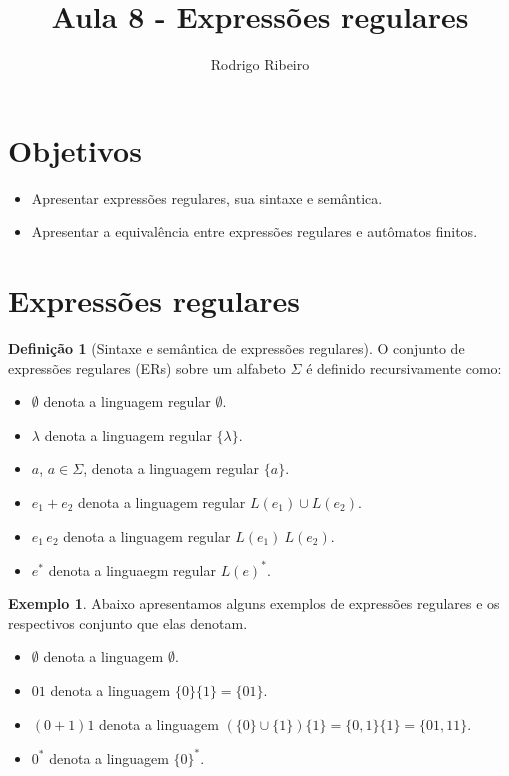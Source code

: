 \documentclass[a4paper]{article}
\theoremstyle{definition}
\newtheorem{Example}{Exemplo}
\newtheorem{Definition}{Definição}
\begin{document}
  \title{Aula 8 - Expressões regulares}
  \author{Rodrigo Ribeiro}

  \maketitle


  \pagestyle{fancy}


  \section*{Objetivos}

  \begin{itemize}
     \item Apresentar expressões regulares, sua sintaxe e semântica.
     \item Apresentar a equivalência entre expressões regulares e
           autômatos finitos.
  \end{itemize}

  \section{Expressões regulares}

  \begin{Definition}[Sintaxe e semântica de expressões regulares]
    O conjunto de expressões regulares (ERs) sobre um alfabeto $\Sigma$ é
    definido recursivamente como:
    \begin{itemize}
       \item $\emptyset$ denota a linguagem regular $\emptyset$.
       \item $\lambda$ denota a linguagem regular $\{\lambda\}$.
       \item $a$, $a\in\Sigma$, denota a linguagem regular $\{a\}$.
       \item $e_1 + e_2$ denota a linguagem regular $L(e_1) \cup L(e_2)$.
       \item $e_1\,e_2$ denota a linguagem regular $L(e_1) \:L(e_2)$.
       \item $e^*$ denota a linguaegm regular $L(e)^*$.
    \end{itemize}
  \end{Definition}

  \begin{Example}
    Abaixo apresentamos alguns exemplos de expressões regulares e os respectivos
    conjunto que elas denotam.
    \begin{itemize}
       \item $\emptyset$ denota a linguagem $\emptyset$.
       \item $01$ denota a linguagem $\{0\}\{1\} = \{01\}$.
       \item $(0 + 1)1$ denota a linguagem $(\{0\} \cup \{1\})\{1\} =
         \{0,1\}\{1\} = \{01,11\}$.
       \item $0^*$ denota a linguagem $\{0\}^*$.
    \end{itemize}
  \end{Example}
\end{document}
